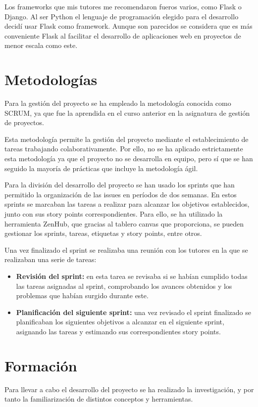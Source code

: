 Los frameworks que mis tutores me recomendaron fueros varios, como Flask o Django. Al ser Python el lenguaje de programación elegido para el desarrollo decidí usar Flask como framework. Aunque son parecidos se considera que es más conveniente Flask al facilitar el desarrollo de aplicaciones web en proyectos de menor escala como este.

\section{Metodologías}
Para la gestión del proyecto se ha empleado la metodología conocida como SCRUM, ya que fue la aprendida en el curso anterior en la asignatura de gestión de proyectos. 

Esta metodología permite la gestión del proyecto mediante el establecimiento de tareas trabajando colaborativamente. Por ello, no se ha aplicado estrictamente esta metodología ya que el proyecto no se desarrolla en equipo, pero sí que se han seguido la mayoría de prácticas que incluye la metodología ágil.

Para la división del desarrollo del proyecto se han usado los sprints que han permitido la organización de las issues en períodos de dos semanas. En estos sprints se marcaban las tareas a realizar para alcanzar los objetivos establecidos, junto con sus story points correspondientes. Para ello, se ha utilizado la herramienta ZenHub, que gracias al tablero canvas que proporciona, se pueden gestionar los sprints, tareas, etiquetas y story points, entre otros. 

Una vez finalizado el sprint se realizaba una reunión con los tutores en la que se realizaban una serie de tareas:
\begin{itemize}
\item \textbf{Revisión del sprint:} en esta tarea se revisaba si se habían cumplido todas las tareas asignadas al sprint, comprobando los avances obtenidos y los problemas que habían surgido durante este.
\item \textbf{Planificación del siguiente sprint:} una vez revisado el sprint finalizado se planificaban los siguientes objetivos a alcanzar en el siguiente sprint, asignando las tareas y estimando sus correspondientes story points.
\end{itemize}

\section{Formación}
Para llevar a cabo el desarrollo del proyecto se ha realizado la investigación, y por tanto la familiarización de distintos conceptos y herramientas. 
